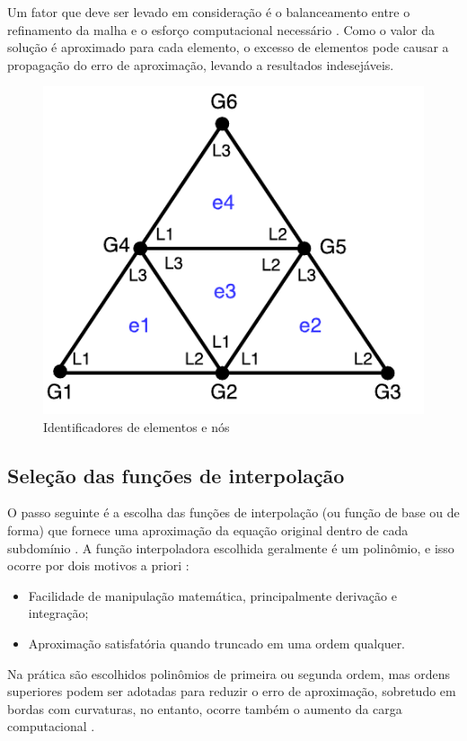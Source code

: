 \documentclass[
    12pt,               %
    openright,          %
    oneside,
    a4paper,            %
    english,            %
    french,             %
    spanish,            %
    brazil              %
    ]{abntex2}
\begin{document}
Um fator que deve ser levado em consideração é o balanceamento entre o refinamento da malha e o esforço computacional necessário \cite{desai}. Como o valor da solução é aproximado para cada elemento, o excesso de elementos pode causar a propagação do erro de aproximação, levando a resultados indesejáveis.


\begin{figure}[!htb]
	\centering
	\includegraphics[scale=1]{figuras/id.pdf}
	\caption{Identificadores de elementos e nós}
	\label{fig:numeracao}
\end{figure}

\subsection{Seleção das funções de interpolação}
\label{sec:interp}
O passo seguinte é a escolha das funções de interpolação (ou função de base ou de forma) \cite{huebner} que fornece uma aproximação da equação original dentro de cada subdomínio \cite{jin}. 
A função interpoladora escolhida geralmente é um polinômio, e isso ocorre por dois motivos a priori \cite{desai}:

\begin{itemize}  
	\item Facilidade de manipulação matemática, principalmente derivação e integração;
	\item Aproximação satisfatória quando truncado em uma ordem qualquer.
\end{itemize}

Na prática são escolhidos polinômios de primeira ou segunda ordem, mas ordens superiores podem ser adotadas para reduzir o erro de aproximação, sobretudo em bordas com curvaturas, no entanto, ocorre também o aumento da carga computacional \cite{jin}.
\end{document}
